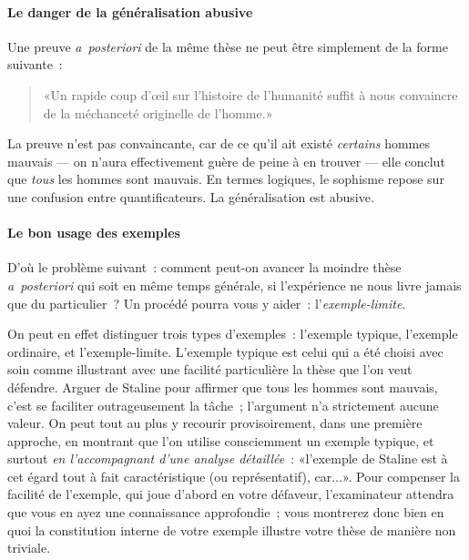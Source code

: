 \documentclass[a4paper,11pt]{article}
\newcommand{\apost}{\emph{a~posteriori}}
\begin{document}
\paragraph{Le danger de la généralisation abusive}

Une preuve \apost{} de la même thèse ne peut être simplement de la forme
suivante~: 
\begin{quote}
  «Un rapide coup d'œil sur l'histoire de l'humanité suffit à nous
  convaincre de la méchanceté originelle de l'homme.»
\end{quote}
La preuve n'est pas convaincante, car de ce qu'il ait existé
\emph{certains} hommes mauvais --- on n'aura effectivement guère de
peine à en trouver --- elle conclut que \emph{tous} les hommes sont
mauvais. En termes logiques, le sophisme repose sur une confusion entre
quantificateurs. La généralisation est abusive.

\par


\paragraph{Le bon usage des exemples}

D'où le problème suivant~: comment peut-on avancer la moindre thèse
\apost{} qui soit en même temps générale, si l'expérience ne nous livre
jamais que du particulier~? Un procédé pourra vous y aider~:
l'\emph{exemple-limite}.

\par

On peut en effet distinguer trois types d'exemples~: l'exemple typique,
l'exemple ordinaire, et l'exemple-limite. L'exemple typique est celui
qui a été choisi avec soin comme illustrant avec une facilité
particulière la thèse que l'on veut défendre. Arguer de Staline pour
affirmer que tous les hommes sont mauvais, c'est se faciliter
outrageusement la tâche~; l'argument n'a strictement aucune valeur. On
peut tout au plus y recourir provisoirement, dans une première approche,
en montrant que l'on utilise consciemment un exemple typique, et surtout
\emph{en l'accompagnant d'une analyse détaillée}~: «l'exemple de Staline
est à cet égard tout à fait caractéristique (ou représentatif), car...».
Pour compenser la facilité de l'exemple, qui joue d'abord en votre
défaveur, l'examinateur attendra que vous en ayez une connaissance
approfondie~; vous montrerez donc bien en quoi la constitution interne
de votre exemple illustre votre thèse de manière non triviale.
\end{document}
